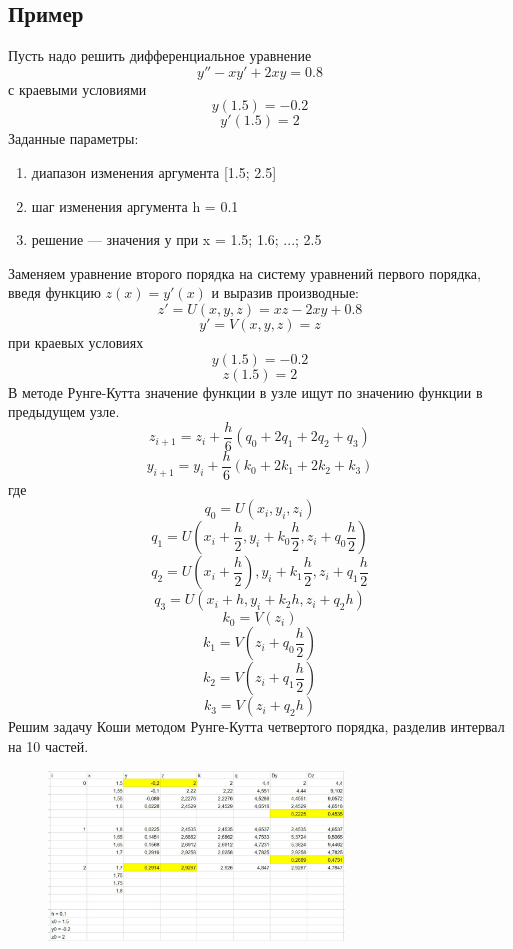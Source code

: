 \documentclass[a4paper]{article}
\newcommand{\addsubsection}[1]{\addcontentsline{toc}{subsection}{#1}
\subsection*{\centering #1}}
\begin{document}
\addsubsection{Пример}
Пусть надо решить дифференциальное уравнение
\[y''-xy'+2xy=0.8\] 
с краевыми условиями \[y(1.5) = -0.2\]
\[y'(1.5) = 2\]
Заданные параметры:
\begin{enumerate}
    \item диапазон изменения аргумента [1.5; 2.5]
    \item шаг изменения аргумента h = 0.1
    \item решение --- значения у при x = 1.5; 1.6; ...; 2.5
\end{enumerate}
\clearpage\noindent Заменяем уравнение второго порядка на систему уравнений первого порядка, введя функцию $z(x) = y'(x)$ и выразив производные:
\[z' = U(x, y, z) = xz - 2xy + 0.8\]
\[y' = V(x, y ,z) = z\]
при краевых условиях\\
\[y(1.5) = -0.2\]
\[z(1.5) = 2\]
В методе Рунге-Кутта значение функции в узле ищут по значению функции в предыдущем узле.
\[z_{i+1} = z_i + \frac{h}{6}(q_0+2q_1+2q_2+q_3)\]
\[y_{i+1} = y_i + \frac{h}{6}(k_0 + 2k_1 + 2k_2 + k_3)\] где
\[q_0 = U(x_i, y_i, z_i)\]
\[q_1 = U(x_i + \frac{h}{2}, y_i + k_0\frac{h}{2}, z_i + q_0 \frac{h}{2})\]
\[q_2 = U(x_i + \frac{h}{2}), y_i + k_1 \frac{h}{2}, z_i+q_1\frac{h}{2}\]
\[q_3 = U(x_i + h, y_i + k_2h, z_i + q_2h)\]
\[k_0 = V(z_i)\]
\[k_1 = V(z_i + q_0\frac{h}{2})\]
\[k_2 = V(z_i + q_1\frac{h}{2})\]
\[k_3 = V(z_i + q_2h)\]
Решим задачу Коши методом Рунге-Кутта четвертого порядка, разделив интервал на 10 частей.
\begin{figure}[H]
    \centering\includegraphics[width=0.7\textwidth]{rk-method.jpg}
\end{figure}
\end{document}
